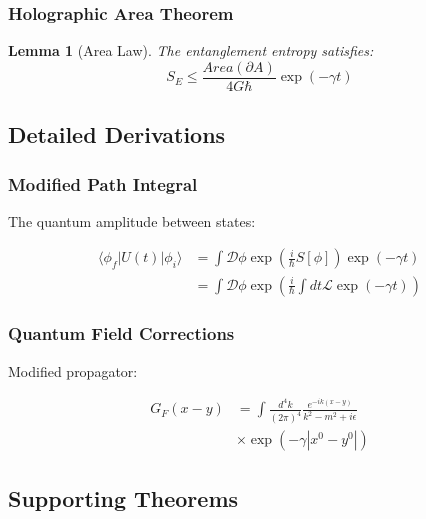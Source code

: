 \documentclass[12pt]{article}
\theoremstyle{plain}
\newtheorem{lemma}[theorem]{Lemma}
\theoremstyle{definition}
\theoremstyle{remark}
\begin{document}
\subsubsection{Holographic Area Theorem}

\begin{lemma}[Area Law]
The entanglement entropy satisfies:
\begin{equation}
S_E \leq \frac{Area(\partial A)}{4G\hbar}\exp(-\gamma t)
\end{equation}
\end{lemma}

\subsection{Detailed Derivations}

\subsubsection{Modified Path Integral}

The quantum amplitude between states:

\begin{equation}
\begin{aligned}
\langle\phi_f|U(t)|\phi_i\rangle &= \int\mathcal{D}\phi\exp\left(\frac{i}{\hbar}S[\phi]\right)\exp(-\gamma t) \\
&= \int\mathcal{D}\phi\exp\left(\frac{i}{\hbar}\int dt\mathcal{L}\exp(-\gamma t)\right)
\end{aligned}
\end{equation}

\subsubsection{Quantum Field Corrections}

Modified propagator:

\begin{equation}
\begin{aligned}
G_F(x-y) &= \int\frac{d^4k}{(2\pi)^4}\frac{e^{-ik(x-y)}}{k^2-m^2+i\epsilon} \\
&\times\exp(-\gamma|x^0-y^0|)
\end{aligned}
\end{equation}

\subsection{Supporting Theorems}
\end{document}
